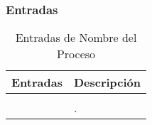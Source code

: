 \subsubsection{Entradas}							%

\begin{table}[H]
\centering
	\begin{tabular}{p{5cm} p{11cm}}
		\hline
			\textbf{Entradas} & \textbf{Descripción}\\
		\hline
		\hline
		 &   \\
		\hline
		 & .   \\	
		\hline
	\end{tabular}
\caption{Entradas de Nombre del Proceso}
\end{table}